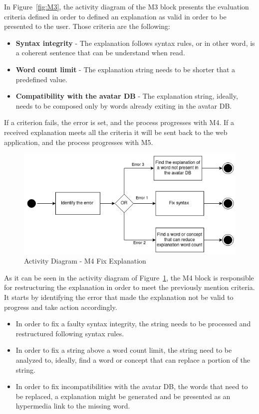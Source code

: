 In Figure~\ref{fig:M3}, the activity diagram of the M3 block presents the evaluation criteria defined in order to defined an explanation as valid in order to be presented to the user.
Those criteria are the following:

\begin{itemize}
    \item \textbf{Syntax integrity} - The explanation follows syntax rules, or in other word, is a coherent sentence that can be understand when read.
    \item \textbf{Word count limit} - The explanation string needs to be shorter that a predefined value.
    \item \textbf{Compatibility with the avatar \gls{DB}} - The explanation string, ideally, needs to be composed only by words already exiting in the avatar \gls{DB}.
\end{itemize}

If a criterion fails, the error is set, and the process progresses with M4.
If a received explanation meets all the criteria it will be sent back to the web application, and the process progresses with M5.

\begin{figure}[H]
\centering
\includegraphics[width=\textwidth,keepaspectratio]{ch4/assets/M4.png}
\caption[Actibity Diagram Fix Explanation Module]{Activity Diagram - M4 Fix Explanation}
\label{fig:M4}
\end{figure}

As it can be seen in the activity diagram of Figure~\ref{fig:M4}, the M4 block is responsible for restructuring the explanation in order to meet the previously mention criteria.
It starts by identifying the error that made the explanation not be valid to progress and take action accordingly.

\begin{itemize}
    \item In order to fix a faulty syntax integrity, the string needs to be processed and restructured following syntax rules.
    \item In order to fix a string above a word count limit, the string need to be analyzed to, ideally, find a word or concept that can replace a portion of the string.
    \item In order to fix incompatibilities with the avatar \gls{DB}, the words that need to be replaced, a explanation might be generated and be presented as an hypermedia link to the missing word.
\end{itemize}

